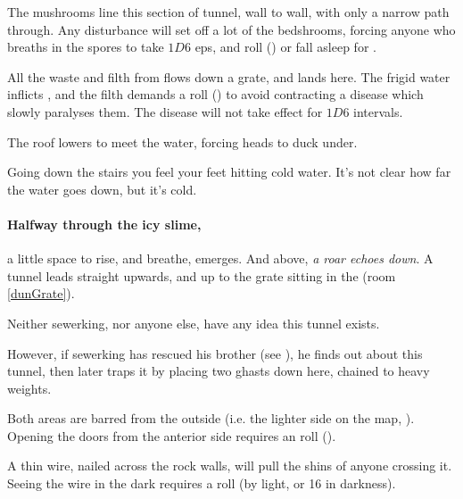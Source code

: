 \begin{multicols}{2}
The mushrooms line this section of tunnel, wall to wall, with only a narrow path through.
Any disturbance will set off a lot of the \glspl{bedshroom}, forcing anyone who breaths in the spores to take $1D6$ \glspl{ep}, and roll  (\tn[12]) or fall asleep for .


All the waste and filth from  flows down a grate, and lands here.
The frigid water inflicts , and the filth demands a  roll (\tn[10]) to avoid contracting a disease which slowly paralyses them.%
The disease will not take effect for $1D6$ \glspl{interval}.

The roof lowers to meet the water, forcing heads to duck under.

\begin{boxtext}
  Going down the stairs you feel your feet hitting cold water.
  It's not clear how far the water goes down, but it's cold.
\end{boxtext}

\paragraph{Halfway through the icy slime,}
a little space to rise, and breathe, emerges.
And above, \emph{a roar echoes down}.
A tunnel leads straight upwards, and up to the grate sitting in the  (room \vref{dunGrate}).

Neither \gls{sewerking}, nor anyone else, have any idea this tunnel exists.

However, if \gls{sewerking} has rescued his brother (see ), he finds out about this tunnel, then later traps it by placing two ghasts down here, chained to heavy weights.



Both areas are barred from the outside (i.e. the lighter side on the map, ).
Opening the doors from the anterior side requires an  roll (\tn[10]).

A thin wire, nailed across the rock walls, will pull the shins of anyone crossing it.
Seeing the wire in the dark requires a  roll (\tn[12] by light, or 16 in darkness).


\end{multicols}
